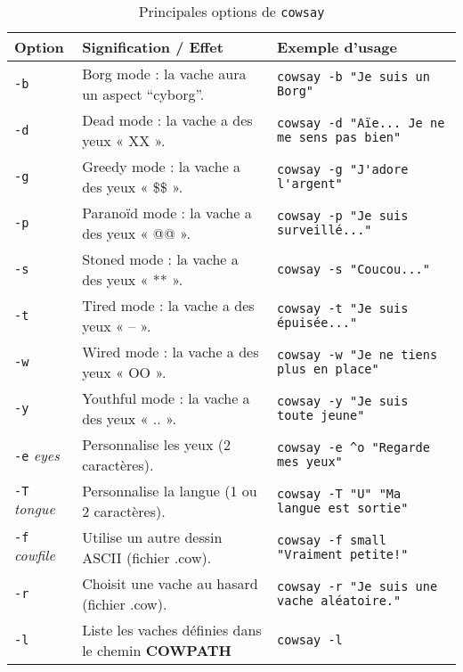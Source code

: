 \documentclass[a4paper,french,11pt]{article}
\begin{document}
\begin{table}[ht]
	\centering
	\begin{tabular}{|l|p{5cm}|p{8.5cm}|}
	\hline
	\textbf{Option} & \textbf{Signification / Effet} & \textbf{Exemple d’usage} \\
	\hline
	\texttt{-b} & Borg mode : la vache aura un aspect “cyborg”. & \verb|cowsay -b "Je suis un Borg"| \\ 
	\hline
	\texttt{-d} & Dead mode : la vache a des yeux « XX ». & \verb|cowsay -d "Aïe... Je ne me sens pas bien"| \\
	\hline
	\texttt{-g} & Greedy mode : la vache a des yeux « \$\$ ». & \verb|cowsay -g "J'adore l'argent"| \\
	\hline
	\texttt{-p} & Paranoïd mode : la vache a des yeux « @@ ». & \verb|cowsay -p "Je suis surveillé..."| \\
	\hline
	\texttt{-s} & Stoned mode : la vache a des yeux « ** ». & \verb|cowsay -s "Coucou..."| \\
	\hline
	\texttt{-t} & Tired mode : la vache a des yeux « -- ». & \verb|cowsay -t "Je suis épuisée..."| \\
	\hline
	\texttt{-w} & Wired mode : la vache a des yeux « OO ». & \verb|cowsay -w "Je ne tiens plus en place"| \\
	\hline
	\texttt{-y} & Youthful mode : la vache a des yeux « .. ». & \verb|cowsay -y "Je suis toute jeune"| \\
	\hline
	\texttt{-e} \emph{eyes} & Personnalise les yeux (2 caractères). & \verb|cowsay -e ^o "Regarde mes yeux"| \\
	\hline
	\texttt{-T} \emph{tongue} & Personnalise la langue (1 ou 2 caractères). & \verb|cowsay -T "U" "Ma langue est sortie"| \\
	\hline
	\texttt{-f} \emph{cowfile} & Utilise un autre dessin ASCII (fichier .cow). & \verb|cowsay -f small "Vraiment petite!"| \\
	\hline
	\texttt{-r} & Choisit une vache au hasard (fichier .cow). & \verb|cowsay -r "Je suis une vache aléatoire."| \\
	\hline
	\texttt{-l} & Liste les vaches définies dans le chemin \textbf{COWPATH} & \verb|cowsay -l| \\
	\hline
	\end{tabular}
	\caption{Principales options de \texttt{cowsay}}
	\label{tab:cowsay-options}
	\end{table}
\end{document}

